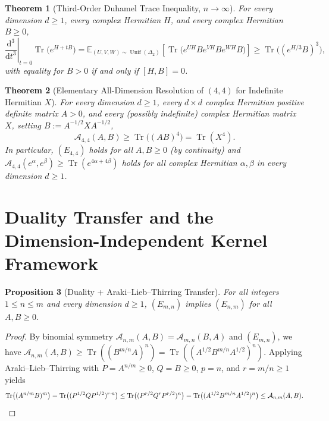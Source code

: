 \documentclass[11pt,a4paper]{article}
\newtheorem{theorem}{Theorem}[section]
\newtheorem{proposition}[theorem]{Proposition}
\theoremstyle{remark}
\newcommand{\Tr}{\operatorname{Tr}}
\begin{document}
\begin{theorem}[Third-Order Duhamel Trace Inequality, $n\to\infty$]\label{thm:duhamel}
For every dimension $d\ge 1$, every complex Hermitian $H$, and every complex Hermitian $B\ge 0$,
\begin{equation}\label{eq:duhamel}
  \left.\frac{\mathrm{d}^3}{\mathrm{d}t^3}\right|_{t=0}\Tr\!\big(e^{H+tB}\big)
  = \mathbb{E}_{(U,V,W)\sim\operatorname{Unif}(\Delta_2)}\!\left[\Tr\!\big(e^{UH}Be^{VH}Be^{WH}B\big)\right]
  \ge \Tr\!\big((e^{H/3}B)^3\big),
\end{equation}
with equality for $B>0$ if and only if $[H,B]=0$.
\end{theorem}

\begin{theorem}[Elementary All-Dimension Resolution of $(4,4)$ for Indefinite Hermitian $X$]\label{thm:44}
For every dimension $d\ge 1$, every $d\times d$ complex Hermitian positive definite matrix $A>0$, and every (possibly indefinite) complex Hermitian matrix $X$, setting $B := A^{-1/2} X A^{-1/2}$,
\begin{equation}\label{eq:E44}
  \mathcal{A}_{4,4}(A,B) \ge \Tr\!\big((AB)^4\big) = \Tr(X^4).
\end{equation}
In particular, $(E_{4,4})$ holds for all $A,B\ge 0$ (by continuity) and $\mathcal{A}_{4,4}(e^\alpha,e^\beta)\ge\Tr(e^{4\alpha+4\beta})$ holds for all complex Hermitian $\alpha,\beta$ in every dimension $d\ge 1$.
\end{theorem}

\section{Duality Transfer and the Dimension-Independent Kernel Framework}

\begin{proposition}[Duality + Araki--Lieb--Thirring Transfer]\label{prop:transfer}
For all integers $1\le n\le m$ and every dimension $d\ge 1$, $(E_{m,n})$ implies $(E_{n,m})$ for all $A,B\ge 0$.
\end{proposition}

\begin{proof}
By binomial symmetry $\mathcal{A}_{n,m}(A,B)=\mathcal{A}_{m,n}(B,A)$ and $(E_{m,n})$, we have $\mathcal{A}_{n,m}(A,B) \ge \Tr((B^{m/n}A)^n) = \Tr((A^{1/2}B^{m/n}A^{1/2})^n)$. Applying Araki--Lieb--Thirring with $P=A^{n/m}\ge 0$, $Q=B\ge 0$, $p=n$, and $r=m/n\ge 1$ yields
\[
\Tr\!\big((A^{n/m}B)^m\big) = \Tr\!\big((P^{1/2}QP^{1/2})^{r\cdot n}\big) \le \Tr\!\big((P^{r/2}Q^r P^{r/2})^n\big) = \Tr\!\big((A^{1/2}B^{m/n}A^{1/2})^n\big) \le \mathcal{A}_{n,m}(A,B). \qedhere
\]
\end{proof}
\end{document}
